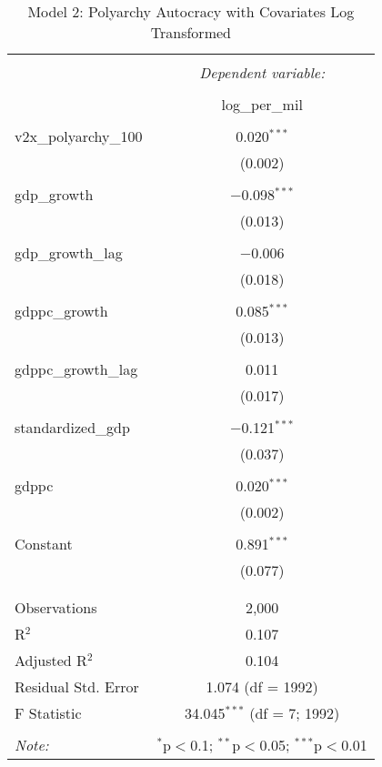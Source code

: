 
\begin{table}[!htbp] \centering 
  \caption{Model 2: Polyarchy Autocracy with Covariates Log Transformed} 
  \label{} 
\begin{tabular}{@{\extracolsep{5pt}}lc} 
\\[-1.8ex]\hline 
\hline \\[-1.8ex] 
 & \multicolumn{1}{c}{\textit{Dependent variable:}} \\ 
\cline{2-2} 
\\[-1.8ex] & log\_per\_mil \\ 
\hline \\[-1.8ex] 
 v2x\_polyarchy\_100 & 0.020$^{***}$ \\ 
  & (0.002) \\ 
  & \\ 
 gdp\_growth & $-$0.098$^{***}$ \\ 
  & (0.013) \\ 
  & \\ 
 gdp\_growth\_lag & $-$0.006 \\ 
  & (0.018) \\ 
  & \\ 
 gdppc\_growth & 0.085$^{***}$ \\ 
  & (0.013) \\ 
  & \\ 
 gdppc\_growth\_lag & 0.011 \\ 
  & (0.017) \\ 
  & \\ 
 standardized\_gdp & $-$0.121$^{***}$ \\ 
  & (0.037) \\ 
  & \\ 
 gdppc & 0.020$^{***}$ \\ 
  & (0.002) \\ 
  & \\ 
 Constant & 0.891$^{***}$ \\ 
  & (0.077) \\ 
  & \\ 
\hline \\[-1.8ex] 
Observations & 2,000 \\ 
R$^{2}$ & 0.107 \\ 
Adjusted R$^{2}$ & 0.104 \\ 
Residual Std. Error & 1.074 (df = 1992) \\ 
F Statistic & 34.045$^{***}$ (df = 7; 1992) \\ 
\hline 
\hline \\[-1.8ex] 
\textit{Note:}  & \multicolumn{1}{r}{$^{*}$p$<$0.1; $^{**}$p$<$0.05; $^{***}$p$<$0.01} \\ 
\end{tabular} 
\end{table} 
